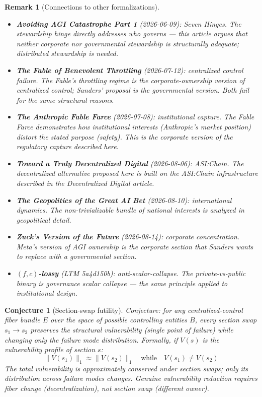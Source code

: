 \documentclass[11pt,a4paper]{article}
\newtheorem{remark}[definition]{Remark}
\newtheorem{conjecture}[definition]{Conjecture}
\begin{document}
\begin{remark}[Connections to other formalizations]
\begin{itemize}
\item \textbf{Avoiding AGI Catastrophe Part 1} (2026-06-09): Seven
  Hinges. The stewardship hinge directly addresses who governs ---
  this article argues that neither corporate nor governmental
  stewardship is structurally adequate; distributed stewardship
  is needed.
\item \textbf{The Fable of Benevolent Throttling} (2026-07-12):
  centralized control failure. The Fable's throttling regime is
  the corporate-ownership version of centralized control; Sanders'
  proposal is the governmental version. Both fail for the same
  structural reasons.
\item \textbf{The Anthropic Fable Farce} (2026-07-08): institutional
  capture. The Fable Farce demonstrates how institutional
  interests (Anthropic's market position) distort the stated
  purpose (safety). This is the corporate version of the
  regulatory capture described here.
\item \textbf{Toward a Truly Decentralized Digital} (2026-08-06):
  ASI:Chain. The decentralized alternative proposed here is built
  on the ASI:Chain infrastructure described in the Decentralized
  Digital article.
\item \textbf{The Geopolitics of the Great AI Bet} (2026-08-10):
  international dynamics. The non-trivializable bundle of
  national interests is analyzed in geopolitical detail.
\item \textbf{Zuck's Version of the Future} (2026-08-14):
  corporate concentration. Meta's version of AGI ownership is
  the corporate section that Sanders wants to replace with a
  governmental section.
\item \textbf{$(f,c)$-lossy} (LTM 5a4d150b): anti-scalar-collapse.
  The private-vs-public binary is governance scalar collapse ---
  the same principle applied to institutional design.
\end{itemize}
\end{remark}

\begin{conjecture}[Section-swap futility]
Conjecture: for any centralized-control fiber bundle $E$ over
the space of possible controlling entities $B$, every section
swap $s_1 \to s_2$ preserves the structural vulnerability
(single point of failure) while changing only the failure mode
distribution. Formally, if $V(s)$ is the vulnerability profile
of section $s$:
\[
  \|V(s_1)\|_1 \approx \|V(s_2)\|_1 \quad
  \text{while} \quad V(s_1) \neq V(s_2)
\]
The total vulnerability is approximately conserved under section
swaps; only its distribution across failure modes changes. Genuine
vulnerability reduction requires fiber change (decentralization),
not section swap (different owner).
\end{conjecture}
\end{document}
